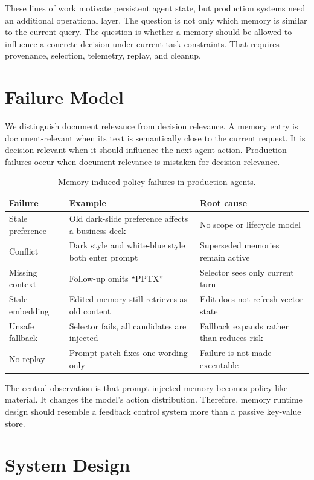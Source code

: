 \documentclass[11pt]{article}
\begin{document}
These lines of work motivate persistent agent state, but production systems need
an additional operational layer. The question is not only which memory is
similar to the current query. The question is whether a memory should be allowed
to influence a concrete decision under current task constraints. That requires
provenance, selection, telemetry, replay, and cleanup.

\section{Failure Model}

We distinguish document relevance from decision relevance. A memory entry is
document-relevant when its text is semantically close to the current request. It
is decision-relevant when it should influence the next agent action. Production
failures occur when document relevance is mistaken for decision relevance.

\begin{table}[h]
\centering
\small
\begin{tabular}{lll}
\toprule
Failure & Example & Root cause \\
\midrule
Stale preference & Old dark-slide preference affects a business deck & No scope or lifecycle model \\
Conflict & Dark style and white-blue style both enter prompt & Superseded memories remain active \\
Missing context & Follow-up omits ``PPTX'' & Selector sees only current turn \\
Stale embedding & Edited memory still retrieves as old content & Edit does not refresh vector state \\
Unsafe fallback & Selector fails, all candidates are injected & Fallback expands rather than reduces risk \\
No replay & Prompt patch fixes one wording only & Failure is not made executable \\
\bottomrule
\end{tabular}
\caption{Memory-induced policy failures in production agents.}
\label{tab:failures}
\end{table}

The central observation is that prompt-injected memory becomes policy-like
material. It changes the model's action distribution. Therefore, memory runtime
design should resemble a feedback control system more than a passive key-value
store.

\section{System Design}
\end{document}
